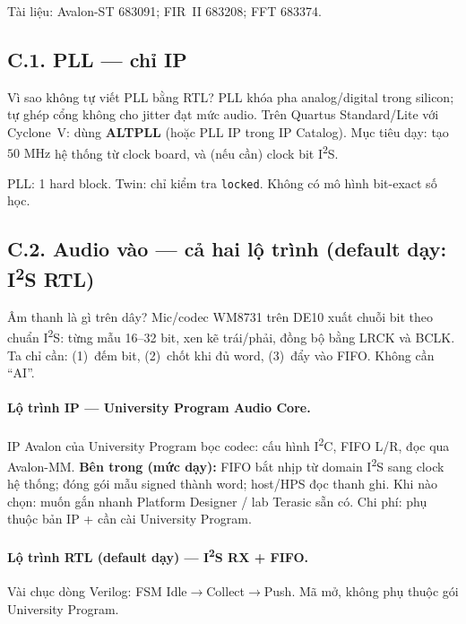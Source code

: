 \noindent Tài liệu: Avalon-ST 683091; FIR~II 683208; FFT 683374.

\subsection*{C.1. PLL --- chỉ IP}

\begin{firstprin}{Vì sao không tự viết PLL bằng RTL?}
PLL khóa pha analog/digital trong silicon; tự ghép cổng không cho jitter đạt mức audio. Trên Quartus Standard/Lite với Cyclone~V: dùng \textbf{ALTPLL} (hoặc PLL IP trong IP Catalog). Mục tiêu dạy: tạo $50\text{ MHz}$ hệ thống từ clock board, và (nếu cần) clock bit I\textsuperscript{2}S.
\end{firstprin}

\begin{costbox}
PLL: 1 hard block. Twin: chỉ kiểm tra \texttt{locked}. Không có mô hình bit-exact số học.
\end{costbox}

\subsection*{C.2. Audio vào --- cả hai lộ trình (default dạy: I\textsuperscript{2}S RTL)}

\begin{firstprin}{Âm thanh là gì trên dây?}
Mic/codec WM8731 trên DE10 xuất chuỗi bit theo chuẩn I\textsuperscript{2}S: từng mẫu 16--32 bit, xen kẽ trái/phải, đồng bộ bằng LRCK và BCLK. Ta chỉ cần: (1)~đếm bit, (2)~chốt khi đủ word, (3)~đẩy vào FIFO. Không cần ``AI''.
\end{firstprin}

\paragraph{Lộ trình IP --- University Program Audio Core.}
IP Avalon của University Program bọc codec: cấu hình I\textsuperscript{2}C, FIFO L/R, đọc qua Avalon-MM. \textbf{Bên trong (mức dạy):} FIFO bắt nhịp từ domain I\textsuperscript{2}S sang clock hệ thống; đóng gói mẫu signed thành word; host/HPS đọc thanh ghi. Khi nào chọn: muốn gắn nhanh Platform Designer / lab Terasic sẵn có. Chi phí: phụ thuộc bản IP + cần cài University Program.

\paragraph{Lộ trình RTL (default dạy) --- I\textsuperscript{2}S RX + FIFO.}
Vài chục dòng Verilog: FSM Idle$\to$Collect$\to$Push. Mã mở, không phụ thuộc gói University Program.

